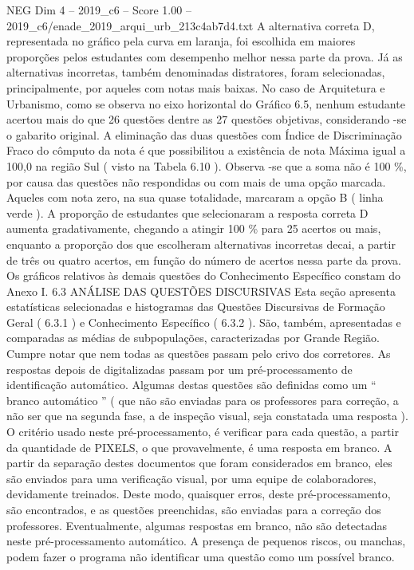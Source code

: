 \begin{textsample}{NEG Dim 4 – 2019\_c6 – Score 1.00 – 2019\_c6/enade\_2019\_arqui\_urb\_213c4ab7d4.txt}
A alternativa correta D, representada no gráfico pela curva em laranja, foi escolhida em maiores proporções pelos estudantes com desempenho melhor nessa parte da prova.
Já as alternativas incorretas, também denominadas distratores, foram selecionadas, principalmente, por aqueles com notas mais baixas.
No caso de Arquitetura e Urbanismo, como se observa no eixo horizontal do Gráfico 6.5, nenhum estudante acertou mais do que 26 questões dentre as 27 questões objetivas, considerando -se o gabarito original.
A eliminação das duas questões com Índice de Discriminação Fraco do cômputo da nota é que possibilitou a existência de nota Máxima igual a 100,0 na região Sul ( visto na Tabela 6.10 ).
Observa -se que a soma não é 100 \%, por causa das questões não respondidas ou com mais de uma opção marcada.
Aqueles com nota zero, na sua quase totalidade, marcaram a opção B ( linha verde ).
A proporção de estudantes que selecionaram a resposta correta D aumenta gradativamente, chegando a atingir 100 \% para 25 acertos ou mais, enquanto a proporção dos que escolheram alternativas incorretas decai, a partir de três ou quatro acertos, em função do número de acertos nessa parte da prova.
Os gráficos relativos às demais questões do Conhecimento Específico constam do Anexo I. 6.3 ANÁLISE DAS QUESTÕES DISCURSIVAS Esta seção apresenta estatísticas selecionadas e histogramas das Questões Discursivas de Formação Geral ( 6.3.1 ) e Conhecimento Específico ( 6.3.2 ).
São, também, apresentadas e comparadas as médias de subpopulações, caracterizadas por Grande Região.
Cumpre notar que nem todas as questões passam pelo crivo dos corretores.
As respostas depois de digitalizadas passam por um pré-processamento de identificação automático.
Algumas destas questões são definidas como um “ branco automático ” ( que não são enviadas para os professores para correção, a não ser que na segunda fase, a de inspeção visual, seja constatada uma resposta ).
O critério usado neste pré-processamento, é verificar para cada questão, a partir da quantidade de PIXELS, o que provavelmente, é uma resposta em branco.
A partir da separação destes documentos que foram considerados em branco, eles são enviados para uma verificação visual, por uma equipe de colaboradores, devidamente treinados.
Deste modo, quaisquer erros, deste pré-processamento, são encontrados, e as questões preenchidas, são enviadas para a correção dos professores.
Eventualmente, algumas respostas em branco, não são detectadas neste pré-processamento automático.
A presença de pequenos riscos, ou manchas, podem fazer o programa não identificar uma questão como um possível branco.

\end{textsample}
